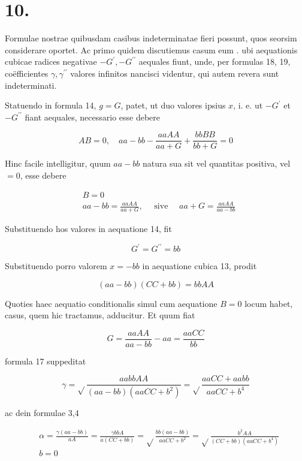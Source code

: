 \documentclass[10pt]{article}
\begin{document}
\section*{10.}
Formulae nostrae quibusdam casibus indeterminatae fieri possunt, quos seorsim considerare oportet. Ac primo quidem discutiemus casum eum . ubi aequationis cubicae radices negativae \(-G^{\prime},-G^{\prime \prime}\) aequales fiunt, unde, per formulas 18, 19, coëfficientes \(\gamma, \gamma^{\prime \prime}\) valores infinitos nancisci videntur, qui autem revera sunt indeterminati.

Statuendo in formula 14, \(g=G\), patet, ut duo valores ipsius \(x\), i. e. ut \(-G^{\prime}\) et \(-G^{\prime \prime}\) fiant aequales, necessario esse debere

\[
A B=0, \quad a a-b b-\frac{a a A A}{a a+G}+\frac{b b B B}{b b+G}=0
\]

Hinc facile intelligitur, quum \(a a-b b\) natura sua sit vel quantitas positiva, vel \(=0\), esse debere

\[
\begin{aligned}
& B=0 \\
& a a-b b=\frac{a a A A}{a a+G}, \quad \text { sive } \quad a a+G=\frac{a a A A}{a a-b b}
\end{aligned}
\]

Substituendo hos valores in aequatione 14, fit

\[
G^{\prime}=G^{\prime \prime}=b b
\]

Substituendo porro valorem \(x=-b b\) in aequatione cubica 13, prodit

\[
(a a-b b)(C C+b b)=b b A A
\]

Quoties haec aequatio conditionalis simul cum aequatione \(B=0\) locum habet, casus, quem hic tractamus, adducitur. Et quum fiat

\[
G=\frac{a a A A}{a a-b b}-a a=\frac{a a C C}{b b}
\]

formula 17 suppeditat

\[
\gamma=\sqrt{ } \frac{a a b b A A}{(a a-b b)\left(a a C C+b^{2}\right)}=\sqrt{ } \frac{a a C C+a a b b}{a a C C+b^{4}}
\]

ac dein formulae 3,4

\[
\begin{aligned}
& \alpha=\frac{\gamma(a a-b b)}{a A}=\frac{\gamma b b A}{a(C C+b b)}=\sqrt{ } \frac{b b(a a-b b)}{a a C C+b^{2}}=\sqrt{ } \frac{b^{2} A A}{(C C+b b)\left(a a C C+b^{4}\right)} \\
& b=0
\end{aligned}
\]
\end{document}
